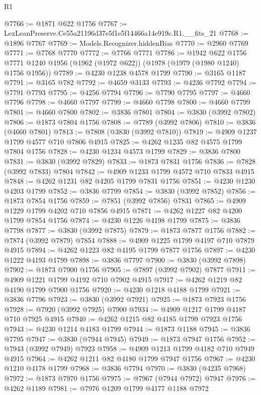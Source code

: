 \begin{lexlean}{R1}
\begin{coremodule}
@7766 := @1871 @622 @1756
@7767 := LexLeanPreserve.Ce55a21196d37e5f1e5f14466a14e919c.R1.__fits_21
@7768 := @1896 @7767
@7769 := Models.Recognizer.hiddenBias
@7770 := @2960 @7769
@7771 := @7768 @7770
@7772 := @7766 @7771
@7786 := @1942
    @622
    @1756
    @7771
    @1240
    @1956
    (@1962 (@1972 @622))
    (@1978 (@1979 (@1980 @1240) @1756 @1956))
@7789 := @4230 @1238 @4578 @1799
@7790 := @3165 @1187
@7791 := @3165 @782
@7792 := @4659 @3133
@7793 := @4236 @7792
@7794 := @7791 @7793
@7795 := @4256 @7794
@7796 := @7790 @7795
@7797 := @4660 @7796
@7798 := @4660 @7797
@7799 := @4660 @7798
@7800 := @4660 @7799
@7801 := @4660 @7800
@7802 := @3836 @7801
@7804 := @3830 (@3992 @7802)
@7806 := @1873 @7804 @1756
@7808 := @7789 (@3992 @7806)
@7810 := @3836 (@4660 @7801)
@7813 := @7808 (@3830 (@3992 @7810))
@7819 := @4909 @1237 @1799 @4577 @710 @7806 @4915
@7825 := @4262 @1235 @82 @4575 @1799 @7804 @1756
@7828 := @4230 @1234 @4573 @1799
@7829 := @3836 @7800
@7831 := @3830 (@3992 @7829)
@7833 := @1873 @7831 @1756
@7836 := @7828 (@3992 @7833) @7804
@7842 := @4909 @1233 @1799 @4572 @710 @7833 @4915
@7848 := @4262 @1231 @82 @4205 @1799 @7831 @1756
@7851 := @4230 @1230 @4203 @1799
@7852 := @3836 @7799
@7854 := @3830 (@3992 @7852)
@7856 := @1873 @7854 @1756
@7859 := @7851 (@3992 @7856) @7831
@7865 := @4909 @1229 @1799 @4202 @710 @7856 @4915
@7871 := @4262 @1227 @82 @4200 @1799 @7854 @1756
@7874 := @4230 @1226 @4198 @1799
@7875 := @3836 @7798
@7877 := @3830 (@3992 @7875)
@7879 := @1873 @7877 @1756
@7882 := @7874 (@3992 @7879) @7854
@7888 := @4909 @1225 @1799 @4197 @710 @7879 @4915
@7894 := @4262 @1223 @82 @4195 @1799 @7877 @1756
@7897 := @4230 @1222 @4193 @1799
@7898 := @3836 @7797
@7900 := @3830 (@3992 @7898)
@7902 := @1873 @7900 @1756
@7905 := @7897 (@3992 @7902) @7877
@7911 := @4909 @1221 @1799 @4192 @710 @7902 @4915
@7917 := @4262 @1219 @82 @4190 @1799 @7900 @1756
@7920 := @4230 @1218 @4188 @1799
@7921 := @3836 @7796
@7923 := @3830 (@3992 @7921)
@7925 := @1873 @7923 @1756
@7928 := @7920 (@3992 @7925) @7900
@7934 := @4909 @1217 @1799 @4187 @710 @7925 @4915
@7940 := @4262 @1215 @82 @4185 @1799 @7923 @1756
@7943 := @4230 @1214 @4183 @1799
@7944 := @1873 @1188
@7945 := @3836 @7795
@7947 := @3830 (@7944 @7945)
@7949 := @1873 @7947 @1756
@7952 := @7943 (@3992 @7949) @7923
@7958 := @4909 @1213 @1799 @4182 @710 @7949 @4915
@7964 := @4262 @1211 @82 @4180 @1799 @7947 @1756
@7967 := @4230 @1210 @4178 @1799
@7968 := @3836 @7794
@7970 := @3830 (@4235 @7968)
@7972 := @1873 @7970 @1756
@7975 := @7967 (@7944 @7972) @7947
@7976 := @4262 @1189
@7981 := @7976 @1209 @1799 @4177 @1188 @7972

\end{coremodule}
\end{lexlean}
